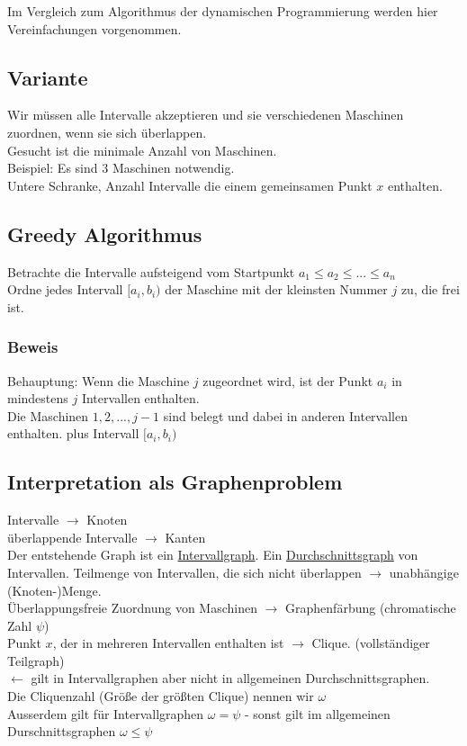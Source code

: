Im Vergleich zum Algorithmus der dynamischen Programmierung werden hier Vereinfachungen vorgenommen. 
\subsection{Variante}
Wir müssen alle Intervalle akzeptieren und sie verschiedenen Maschinen zuordnen, wenn sie sich überlappen.\\
Gesucht ist die minimale Anzahl von Maschinen.\\
Beispiel: Es sind 3 Maschinen notwendig.\\
Untere Schranke, Anzahl Intervalle die einem gemeinsamen Punkt $x$ enthalten.\\
\subsection{Greedy Algorithmus}
Betrachte die Intervalle aufsteigend vom Startpunkt $a_1 \leq a_2 \leq ...\leq a_n$\\
Ordne jedes Intervall $[a_i,b_i)$ der Maschine mit der kleinsten Nummer $j$ zu, die frei ist.\\
\subsubsection{Beweis}
Behauptung: Wenn die Maschine $j$ zugeordnet wird, ist der Punkt $a_i$ in mindestens $j$ Intervallen enthalten.\\
Die Maschinen $1,2,...,j-1$ sind belegt und dabei in anderen Intervallen enthalten. plus Intervall $[a_i,b_i)$\\
\subsection{Interpretation als Graphenproblem}
Intervalle $\rightarrow$ Knoten\\
überlappende Intervalle $\rightarrow$ Kanten\\
Der entstehende Graph ist ein \underline{Intervallgraph}. Ein \underline{Durchschnittsgraph} von Intervallen.
Teilmenge von Intervallen, die sich nicht überlappen $\rightarrow$ unabhängige (Knoten-)Menge.\\
Überlappungsfreie Zuordnung von Maschinen $\rightarrow$ Graphenfärbung (chromatische Zahl $\psi$)\\
Punkt $x$, der in mehreren Intervallen enthalten ist $\rightarrow$ Clique. (vollständiger Teilgraph)\\
$\leftarrow$ gilt in Intervallgraphen aber nicht in allgemeinen Durchschnittsgraphen.\\
Die Cliquenzahl (Größe der größten Clique) nennen wir $\omega$\\
Ausserdem gilt für Intervallgraphen $\omega = \psi$ - sonst gilt im allgemeinen Durschnittsgraphen $\omega \leq \psi$\\

